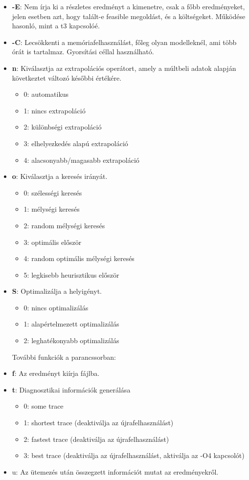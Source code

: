 \documentclass [12pt]{report}
\begin{document}
   \begin{itemize}
   \item \textbf{-E}: Nem írja ki a részletes eredményt a kimenetre, csak a főbb eredményeket, jelen esetben azt, hogy talált-e feasible megoldást, és a költségeket. Működése hasonló, mint a t3 kapcsolóé. 
   \item \textbf{-C}: Lecsökkenti a memóriafelhasználást, főleg olyan modelleknél, ami több órát is tartalmaz. Gyorsítási céllal használható.
   \item \textbf{n}: Kiválasztja az extrapolációs operátort, amely a múltbeli adatok alapján következtet változó  későbbi értékére. 
   			\begin{itemize}
   			\item {0}: automatikus
   			\item {1}: nincs extrapoláció
   			\item {2}: különbségi extrapoláció
   			\item {3}: elhelyezkedés alapú extrapoláció
   			\item {4}: alacsonyabb/magasabb extrapoláció
   			\end{itemize}
   \item \textbf{o}: Kiválasztja a keresés irányát.
   			\begin{itemize}
			\item {0}: szélességi keresés
   			\item {1}: mélységi keresés
   			\item {2}: random mélységi keresés
   			\item {3}: optimális először
   			\item {4}: random optimális mélységi keresés
   			\item {5}: legkisebb heurisztikus először
   			\end{itemize}
   \item \textbf{S}: Optimalizálja a helyigényt. 
   				\begin{itemize}
   				\item {0}: nincs optimalizálás
      			\item {1}: alapértelmezett optimalizálás
      			\item {2}: leghatékonyabb optimalizálás
      			\end{itemize}
  További funkciók a parancssorban:
  \item \textbf{f}: Az eredményt kiírja fájlba.
  \item \textbf{t}: Diagnosztikai információk generálása
  		\begin{itemize}
  		   				\item {0}: some trace
  		      			\item {1}: shortest trace (deaktiválja az újrafelhasználást)
  		      			\item {2}: fastest trace (deaktiválja az újrafelhasználást)
  		      			\item {3}: best trace (deaktiválja az újrafelhasználást, aktiválja az -O4 kapcsolót)
  		      			\end{itemize}
  	\item {u}: Az ütemezés után összegzett információt mutat az eredményekről.
   \end{itemize}
   
\end{document}
